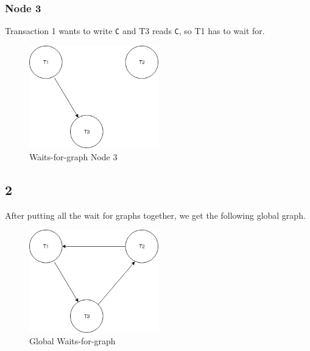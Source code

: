\subsubsection{Node 3}
Transaction 1 wants to write \texttt{C} and T3 reads \texttt{C}, so T1 has to wait for.
\begin{figure}[htb!]
	\center
	\includegraphics[width=0.5\textwidth]{img/Node3}
	\caption{Waits-for-graph Node 3}
\end{figure}


\subsection{2}
After putting all the wait for graphs together, we get the following global graph.

\begin{figure}[htb!]
	\center
	\includegraphics[width=0.5\textwidth]{img/Globalgraph}
	\caption{Global Waits-for-graph}
\end{figure}

